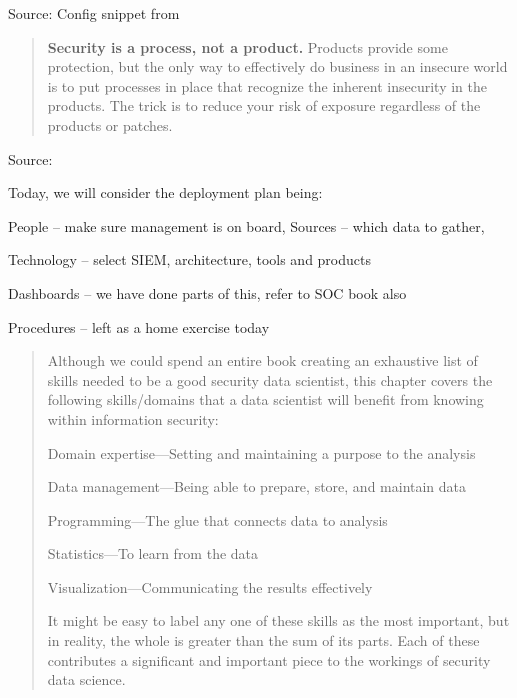 \documentclass[Screen16to9,17pt]{foils}
\begin{document}
Source:
Config snippet from\\
{\small{}}







\begin{quote}{\bf
Security is a process, not a product.} Products provide some protection, but the only way to effectively do business in an insecure world is to put processes in place that recognize the inherent insecurity in the products. The trick is to reduce your risk of exposure regardless of the products or patches.
\end{quote}
Source: 

Today, we will consider the deployment plan being:
\begin{list2}
\item People -- make sure management is on board, Sources -- which data to gather,
\item Technology -- select SIEM, architecture, tools and products
\item Dashboards -- we have done parts of this, refer to SOC book also
\item Procedures -- left as a home exercise today
\end{list2}




\begin{quote}
Although we could spend an entire book creating an exhaustive list of skills needed to be a good security data scientist, this chapter covers the following skills/domains that a data scientist will benefit from
knowing within information security:
\begin{list2}
\item Domain expertise—Setting and maintaining a purpose to the analysis
\item Data management—Being able to prepare, store, and maintain data
\item Programming—The glue that connects data to analysis
\item Statistics—To learn from the data
\item Visualization—Communicating the results effectively
\end{list2}
It might be easy to label any one of these skills as the most important, but in reality, the whole is greater than the sum of its parts. Each of these contributes a significant and important piece to the workings of
security data science.
\end{quote}
\end{document}
